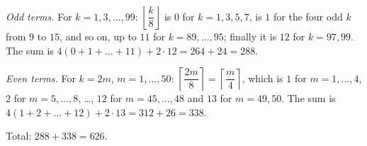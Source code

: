 \emph{Odd terms.} For $k=1,3,\dots,99$: $\left\lfloor\dfrac {k}{8}\right\rfloor$ is $0$ for $k=1,3,5,7$, is $1$ for the four odd $k$ from $9$ to $15$, and so on, up to $11$ for $k=89,\dots,95$; finally it is $12$ for $k=97,99$. The sum is $4(0+1+\dots+11)+2\cdot12=264+24=288$.

\emph{Even terms.} For $k=2m$, $m=1,\dots,50$: $\left\lceil\dfrac{2m}{8}\right\rceil=\left\lceil\dfrac {m}{4}\right\rceil$, which is $1$ for $m=1,\dots,4$, $2$ for $m=5,\dots,8$, \dots, $12$ for $m=45,\dots,48$ and $13$ for $m=49,50$. The sum is $4(1+2+\dots+12)+2\cdot13=312+26=338$.

Total: $288+338=\boxed{626}$.
